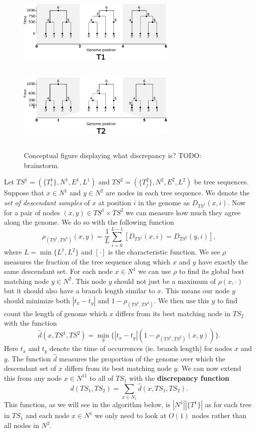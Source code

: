 \documentclass[10pt,twoside,lineno]{gsajnl}
\begin{document}
\begin{figure}[!ht]
	\begin{center}
\includegraphics[height=1.5in, width=3in]{discrepancy_func_method_t1.pdf}
\includegraphics[height=1.5in, width=3in]{discrepancy_function_method_t2.pdf}
    \caption{
        Conceptual figure displaying what discrepancy is?
        TODO: brainstorm.
        \label{fig:conceptual_discrepancy}
    }
	\end{center}
\end{figure}

 Let $TS^1=(\{T_i^1\},N^1,E^1,L^1)$ and $TS^2=(\{T^2_j\},N^2,E^2,L^2)$ be tree sequences.
 Suppose that $x\in N^1$ and $y\in N^2$ are nodes in each tree sequence.
 We denote the \textit{set of descendant samples} of $x$ at position $i$ in the genome as $D_{TS^1}(x,i)$.
 Now for a pair of nodes $(x,y)\in TS^1\times TS^2$ 
 we can measure how much they agree along the genome.
 We do so with the following function
 $$\rho_{(TS^1,TS^2)}(x,y)=\frac{1}{L}\sum_{i=0}^{L-1}[D_{TS^1}(x,i)=D_{TS^2}(y,i)],$$
 where $L=\min\{L^1,L^2\}$ and $[\cdot]$ is the characteristic function. 
 We see $\rho$ measures the fraction of the tree sequence
 along which $x$ and $y$ have exactly the same descendant set. 
 For each node $x\in N^1$ we can use $\rho$ to find its global best matching node $y\in N^2$. 
 This node $y$ should not just be a maximum of $\rho(x,\cdot)$ but it should also have a branch length similar to $x$. 
 This means our node $y$ should minimize both $|t_x-t_y|$ and $1-\rho_{(TS^1,TS^2)}$.
 We then use this $y$ to find count the length of genome which $x$ differs from its best matching node in $TS_2$ with the function
 $$\hat{d}(x,TS^1,TS^2)=\min_y\{|t_x-t_y|(1-\rho_{(TS^1,TS^2)}(x,y))\}.$$
 Here $t_x$ and $t_y$ denote the time of occurrences (ie. branch length) for nodes $x$ and $y$. 
 The function $\hat{d}$ measures the proportion of the genome 
 over which the descendant set of $x$ differs from its best matching node $y$.
 We can now extend this from any node $x\in N^11$ to all of $TS_1$ with the \textbf{discrepancy function}
 $$d(TS_1,TS_2)=\sum_{x\in N_1}\hat{d}(x,TS_1,TS_2).$$
 This function, as we will see in the algorithm below,
 is $|N^1||\{T^1\}|$ as for each tree in $TS_1$ and each node $x\in N^1$ we only need to look at $O(1)$ nodes rather than all nodes in $N^2$.
 
\end{document}

